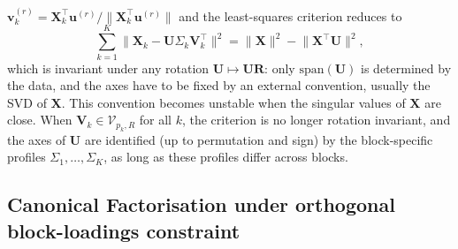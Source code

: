 \documentclass[11pt]{article}
\newcommand{\X}{\mathbf{X}}
\newcommand{\U}{\mathbf{U}}
\newcommand{\V}{\mathbf{V}}
\newcommand{\uu}{\mathbf{u}}
\newcommand{\vv}{\mathbf{v}}
\newcommand{\Stiefel}[2]{\mathcal V_{#1,#2}}
\begin{document}
$\vv_k^{(r)}=\X_k^\intercal\uu^{(r)}/\|\X_k^\intercal\uu^{(r)}\|$ and the least-squares criterion reduces to
\[
  \sum_{k=1}^K\bigl\|\X_k-\U\Sigma_k\V_k^\intercal\bigr\|^2=\|\X\|^2-\bigl\|\X^\intercal\U\bigr\|^2 ,
\]
which is invariant under any rotation $\U\mapsto\U\mathbf R$: only $\mathrm{span}(\U)$ is determined by the data, and the axes have to be fixed by an external convention, usually the SVD of $\X$. This convention becomes unstable when the singular values of $\X$ are close. When $\V_k\in\Stiefel{p_k}{R}$ for all $k$, the criterion is no longer rotation invariant, and the axes of $\U$ are identified (up to permutation and sign) by the block-specific profiles $\Sigma_1,\ldots,\Sigma_K$, as long as these profiles differ across blocks. 
 

\subsection{Canonical Factorisation under orthogonal block-loadings constraint}
\end{document}
